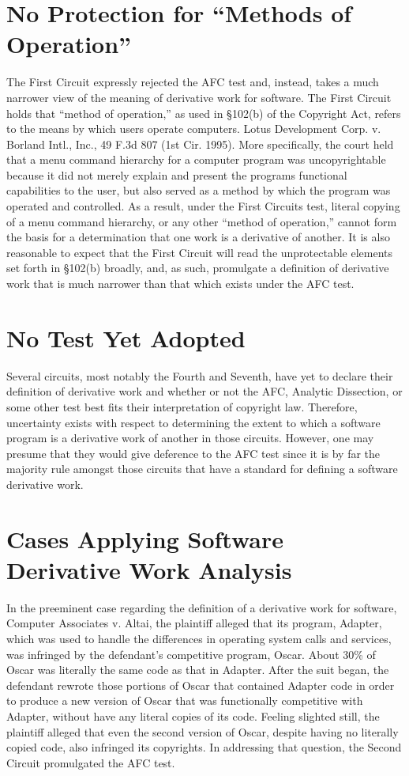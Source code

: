 \section{No Protection for ``Methods of Operation''}

The First Circuit expressly rejected the AFC test and, instead, takes a
much narrower view of the meaning of derivative work for software. The
First Circuit holds that ``method of operation,'' as used in \S 102(b) of
the Copyright Act, refers to the means by which users operate
computers. Lotus Development Corp. v. Borland Intl., Inc., 49 F.3d 807
(1st Cir. 1995). More specifically, the court held that a menu command
hierarchy for a computer program was uncopyrightable because it did not
merely explain and present the programs functional capabilities to the
user, but also served as a method by which the program was operated and
controlled. As a result, under the First Circuits test, literal copying
of a menu command hierarchy, or any other ``method of operation,'' cannot
form the basis for a determination that one work is a derivative of
another. It is also reasonable to expect that the First Circuit will read
the unprotectable elements set forth in \S 102(b) broadly, and, as such,
promulgate a definition of derivative work that is much narrower than that
which exists under the AFC test.

\section{No Test Yet Adopted}

Several circuits, most notably the Fourth and Seventh, have yet to
declare their definition of derivative work and whether or not the
AFC, Analytic Dissection, or some other test best fits their
interpretation of copyright law. Therefore, uncertainty exists with
respect to determining the extent to which a software program is a
derivative work of another in those circuits. However, one may presume
that they would give deference to the AFC test since it is by far the
majority rule amongst those circuits that have a standard for defining
a software derivative work.

\section{Cases Applying Software Derivative Work Analysis}

In the preeminent case regarding the definition of a derivative work for
software, Computer Associates v. Altai, the plaintiff alleged that its
program, Adapter, which was used to handle the differences in operating
system calls and services, was infringed by the defendant's competitive
program, Oscar. About 30\% of Oscar was literally the same code as
that in Adapter. After the suit began, the defendant rewrote those
portions of Oscar that contained Adapter code in order to produce a new
version of Oscar that was functionally competitive with Adapter, without
have any literal copies of its code. Feeling slighted still, the
plaintiff alleged that even the second version of Oscar, despite having no
literally copied code, also infringed its copyrights. In addressing that
question, the Second Circuit promulgated the AFC test.

